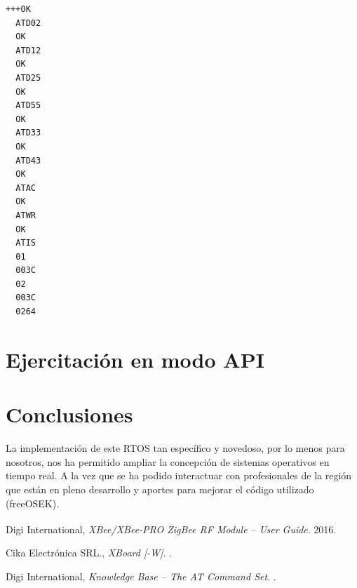 \documentclass[11pt,oneside,spanish,a4paper]{article}
\begin{document}
\begin{lstlisting}[emph={+++,ATIS,ATD02,ATD12,ATD25,ATD55,ATD33,ATD43,ATWR,ATAC},
emphstyle={\color{blue}}, caption={Configuración de todos los canales
analógicos y digitales en la placa XBoard.},label=code:completo]
  +++OK
  ATD02
  OK
  ATD12
  OK
  ATD25
  OK
  ATD55
  OK
  ATD33
  OK
  ATD43
  OK
  ATAC
  OK
  ATWR
  OK
  ATIS
  01
  003C
  02
  003C
  0264
\end{lstlisting}  

\section{Ejercitación en modo API}
\label{sec:API}

\section{Conclusiones}
\label{sec:conc}

La implementación de este RTOS tan específico y novedoso, por lo menos
para nosotros, nos ha permitido ampliar la concepción de sistemas
operativos en tiempo real. A la vez que se ha podido interactuar con
profesionales de la región que están en pleno desarrollo y aportes
para mejorar el código utilizado (freeOSEK). 

\begin{thebibliography}{1}
  Digi International,
  \emph{XBee\textsuperscript{\textregistered{}}/XBee-PRO
    ZigBee\textsuperscript{\textregistered{}} RF Module -- User
    Guide}. 2016.
  
  Cika Electrónica SRL.,
  \emph{XBoard [-W]}.
  .

  Digi International,
  \emph{Knowledge Base -- The AT Command Set}.
  .

\end{thebibliography}



% 

% 


% 
\end{document}
